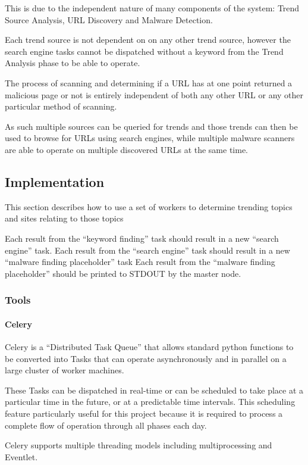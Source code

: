 This is due to the independent nature of many components of the system: Trend Source Analysis, URL Discovery and Malware Detection.

Each trend source is not dependent on on any other trend source, however the search engine tasks cannot be dispatched without a keyword from the Trend Analysis phase to be able to operate.

The process of scanning and determining if a URL has at one point returned a malicious page or not is entirely independent of both any other URL or any other particular method of scanning.

As such multiple sources can be queried for trends and those trends can then be used to browse for URLs using search engines, while multiple malware scanners are able to operate on multiple discovered URLs at the same time.

\subsection{Implementation}
This section describes how to use a set of workers to determine trending topics and sites relating to those topics

Each result from the ``keyword finding'' task should result in a new ``search engine'' task.
Each result from the ``search engine'' task should result in a new ``malware finding placeholder'' task
Each result from the ``malware finding placeholder'' should be printed to STDOUT by the master node.
\subsubsection{Tools}
\paragraph{Celery}
Celery is a ``Distributed Task Queue'' that allows standard python functions to be converted into Tasks that can operate asynchronously and in parallel on a large cluster of worker machines.

These Tasks can be dispatched in real-time or can be scheduled to take place at a particular time in the future, or at a predictable time intervals.  This scheduling feature particularly useful for this project because it is required to process a complete flow of operation through all phases each day.

Celery supports multiple threading models including multiprocessing and Eventlet.

